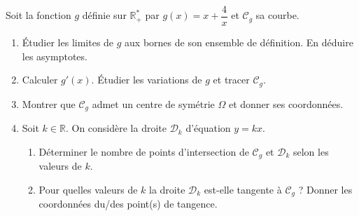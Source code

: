\documentclass[11pt]{article}
\begin{document}
\begin{exercice}
Soit la fonction $g$ définie sur $\mathbb{R}^*_+$ par $g(x)=x+\dfrac{4}{x}$ et $\mathcal{C}_g$ sa courbe.
\begin{enumerate}
    \item Étudier les limites de $g$ aux bornes de son ensemble de définition. En déduire les asymptotes.
    \item Calculer $g'(x)$. Étudier les variations de $g$ et tracer $\mathcal{C}_g$.
    \item Montrer que $\mathcal{C}_g$ admet un centre de symétrie $\Omega$ et donner ses coordonnées.
    \item Soit $k \in \mathbb{R}$. On considère la droite $\mathcal{D}_k$ d'équation $y=kx$. 
    \begin{enumerate}
        \item Déterminer le nombre de points d'intersection de $\mathcal{C}_g$ et $\mathcal{D}_k$ selon les valeurs de $k$.
        \item Pour quelles valeurs de $k$ la droite $\mathcal{D}_k$ est-elle tangente à $\mathcal{C}_g$ ? Donner les coordonnées du/des point(s) de tangence.
    \end{enumerate}
\end{enumerate}
\end{exercice}
\end{document}
